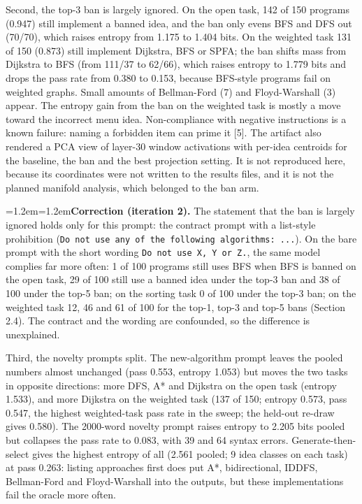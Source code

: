 \documentclass[11pt,letterpaper]{article}
\newenvironment{correction}{\par\medskip\noindent\begin{minipage}{\linewidth}\small\leftskip=1.2em\rightskip=1.2em\noindent}{\end{minipage}\par\medskip}
\begin{document}
Second, the top-3 ban is largely ignored. On the open task, 142 of 150 programs (0.947) still implement a banned idea, and the ban only evens BFS and DFS out (70/70), which raises entropy from 1.175 to 1.404 bits. On the weighted task 131 of 150 (0.873) still implement Dijkstra, BFS or SPFA; the ban shifts mass from Dijkstra to BFS (from 111/37 to 62/66), which raises entropy to 1.779 bits and drops the pass rate from 0.380 to 0.153, because BFS-style programs fail on weighted graphs. Small amounts of Bellman-Ford (7) and Floyd-Warshall (3) appear. The entropy gain from the ban on the weighted task is mostly a move toward the incorrect menu idea. Non-compliance with negative instructions is a known failure: naming a forbidden item can prime it [5]. The artifact also rendered a PCA view of layer-30 window activations with per-idea centroids for the baseline, the ban and the best projection setting. It is not reproduced here, because its coordinates were not written to the results files, and it is not the planned manifold analysis, which belonged to the ban arm.

\begin{correction}\textbf{Correction (iteration 2).} The statement that the ban is largely ignored holds only for this prompt: the contract prompt with a list-style prohibition (\texttt{Do\ not\ use\ any\ of\ the\ following\ algorithms:\allowbreak{}\ ...}). On the bare prompt with the short wording \texttt{Do\ not\ use\ X,\ Y\ or\ Z.}, the same model complies far more often: 1 of 100 programs still uses BFS when BFS is banned on the open task, 29 of 100 still use a banned idea under the top-3 ban and 38 of 100 under the top-5 ban; on the sorting task 0 of 100 under the top-3 ban; on the weighted task 12, 46 and 61 of 100 for the top-1, top-3 and top-5 bans (Section 2.4). The contract and the wording are confounded, so the difference is unexplained.\end{correction}
Third, the novelty prompts split. The new-algorithm prompt leaves the pooled numbers almost unchanged (pass 0.553, entropy 1.053) but moves the two tasks in opposite directions: more DFS, A* and Dijkstra on the open task (entropy 1.533), and more Dijkstra on the weighted task (137 of 150; entropy 0.573, pass 0.547, the highest weighted-task pass rate in the sweep; the held-out re-draw gives 0.580). The 2000-word novelty prompt raises entropy to 2.205 bits pooled but collapses the pass rate to 0.083, with 39 and 64 syntax errors. Generate-then-select gives the highest entropy of all (2.561 pooled; 9 idea classes on each task) at pass 0.263: listing approaches first does put A*, bidirectional, IDDFS, Bellman-Ford and Floyd-Warshall into the outputs, but these implementations fail the oracle more often.
\end{document}
